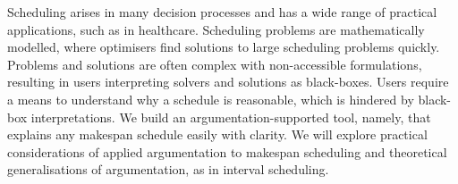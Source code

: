 Scheduling arises in many decision processes and has a wide range of practical applications, such as in healthcare. Scheduling problems are mathematically modelled, where optimisers find solutions to large scheduling problems quickly. Problems and solutions are often complex with non-accessible formulations, resulting in users interpreting solvers and solutions as black-boxes. Users require a means to understand why a schedule is reasonable, which is hindered by black-box interpretations.
\linespace
We build an argumentation-supported tool, namely, \emph{\toolname} that explains any makespan schedule easily with clarity. We will explore practical considerations of applied argumentation to makespan scheduling and theoretical generalisations of argumentation, as in interval scheduling.